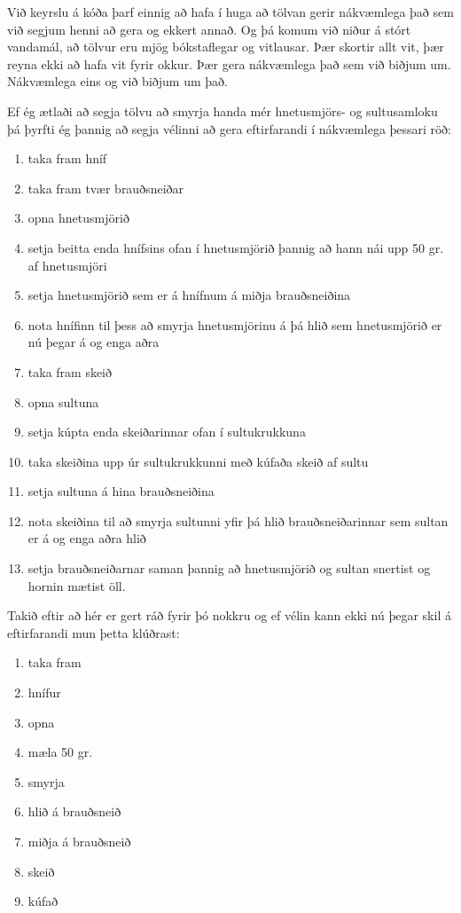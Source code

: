 Við keyrslu á kóða þarf einnig að hafa í huga að tölvan gerir nákvæmlega það sem við segjum henni að gera og ekkert annað.
Og þá komum við niður á stórt vandamál, að tölvur eru mjög bókstaflegar og vitlausar.
Þær skortir allt vit, þær reyna ekki að hafa vit fyrir okkur. 
Þær gera nákvæmlega það sem við biðjum um.
Nákvæmlega eins og við biðjum um það.

Ef ég ætlaði að segja tölvu að smyrja handa mér hnetusmjörs- og sultusamloku þá þyrfti ég þannig að segja vélinni að gera eftirfarandi í nákvæmlega þessari röð:
\vspace{0.4cm}
\begin{enumerate}
	\item taka fram hníf
	\item taka fram tvær brauðsneiðar
	\item opna hnetusmjörið
	\item setja beitta enda hnífsins ofan í hnetusmjörið þannig að hann nái upp 50 gr. af hnetusmjöri
	\item setja hnetusmjörið sem er á hnífnum á miðja brauðsneiðina
	\item nota hnífinn til þess að smyrja hnetusmjörinu á þá hlið sem hnetusmjörið er nú þegar á og enga aðra
	\item taka fram skeið
	\item opna sultuna
	\item setja kúpta enda skeiðarinnar ofan í sultukrukkuna 
	\item taka skeiðina upp úr sultukrukkunni með kúfaða skeið af sultu
	\item setja sultuna á hina brauðsneiðina
	\item nota skeiðina til að smyrja sultunni yfir þá hlið brauðsneiðarinnar sem sultan er á og enga aðra hlið
	\item  setja brauðsneiðarnar saman þannig að hnetusmjörið og sultan snertist og hornin mætist öll. 
\end{enumerate} 
\vspace{0.4cm}
Takið eftir að hér er gert ráð fyrir þó nokkru og ef vélin kann ekki nú þegar skil á eftirfarandi mun þetta klúðrast: 
\vspace{0.2cm}
\begin{enumerate}
	\item taka fram
	\item hnífur
	\item opna
	\item mæla 50 gr.
	\item smyrja
	\item hlið á brauðsneið
	\item miðja á brauðsneið
	\item skeið
	\item kúfað
\end{enumerate} 
\vspace{0.2cm}

